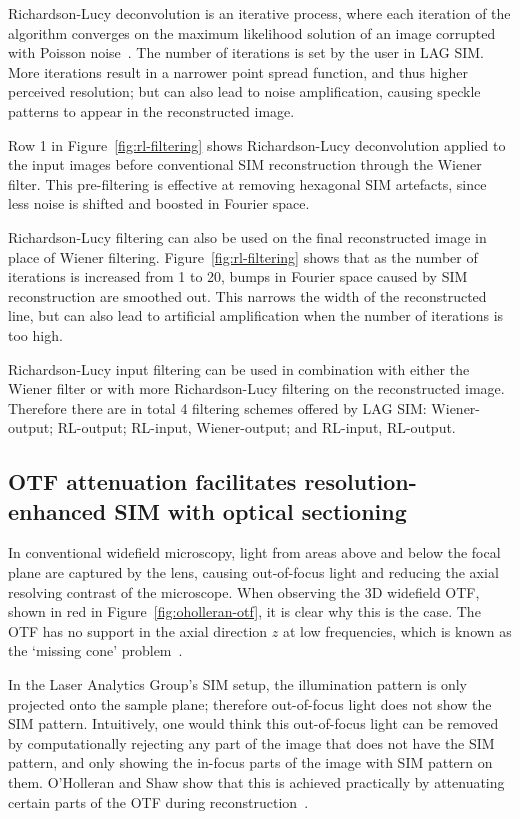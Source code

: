 Richardson-Lucy deconvolution is an iterative process, where each iteration of the algorithm converges on the maximum likelihood solution of an image corrupted with Poisson noise~\cite{richardson1972bayesian, lucy1974iterative}.
The number of iterations is set by the user in LAG SIM.
More iterations result in a narrower point spread function, and thus higher perceived resolution; but can also lead to noise amplification, causing speckle patterns to appear in the reconstructed image.

Row 1 in Figure~\ref{fig:rl-filtering} shows Richardson-Lucy deconvolution applied to the input images before conventional SIM reconstruction through the Wiener filter.
This pre-filtering is effective at removing hexagonal SIM artefacts, since less noise is shifted and boosted in Fourier space.

Richardson-Lucy filtering can also be used on the final reconstructed image in place of Wiener filtering.
Figure~\ref{fig:rl-filtering} shows that as the number of iterations is increased from 1 to 20, bumps in Fourier space caused by SIM reconstruction are smoothed out.
This narrows the width of the reconstructed line, but can also lead to artificial amplification when the number of iterations is too high.

Richardson-Lucy input filtering can be used in combination with either the Wiener filter or with more Richardson-Lucy filtering on the reconstructed image.
Therefore there are in total 4 filtering schemes offered by LAG SIM: Wiener-output; RL-output; RL-input, Wiener-output; and RL-input, RL-output.

\subsection{OTF attenuation facilitates resolution-enhanced SIM with optical sectioning}\label{sec:LAGSIM-OTF-attenuation}
In conventional widefield microscopy, light from areas above and below the focal plane are captured by the lens, causing out-of-focus light and reducing the axial resolving contrast of the microscope.
When observing the 3D widefield OTF, shown in red in Figure~\ref{fig:oholleran-otf}, it is clear why this is the case.
The OTF has no support in the axial direction $z$ at low frequencies, which is known as the `missing cone' problem~\cite{sheppard1992significance}.

In the Laser Analytics Group's SIM setup, the illumination pattern is only projected onto the sample plane; therefore out-of-focus light does not show the SIM pattern.
Intuitively, one would think this out-of-focus light can be removed by computationally rejecting any part of the image that does not have the SIM pattern, and only showing the in-focus parts of the image with SIM pattern on them.
O'Holleran and Shaw show that this is achieved practically by attenuating certain parts of the OTF during reconstruction~\cite{oholleran2014optimized}.

